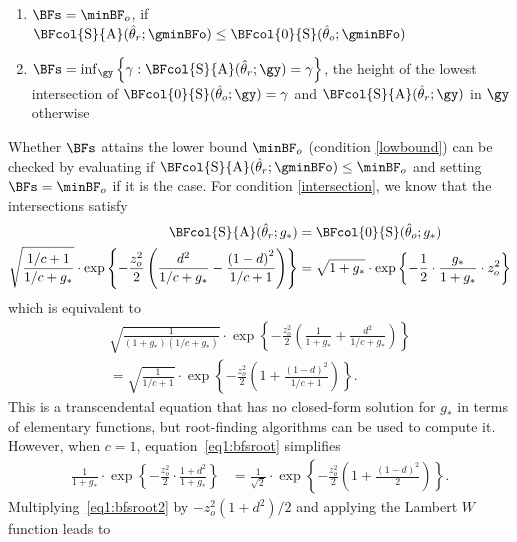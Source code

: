 \begin{subappendices}
\begin{enumerate}
  \item \label{lowbound} $\BFs = \minBF_{o}$, if
  $\BFcol{\text{S}}{\text{A}}(\hat{\theta}_r; \gminBFo) \leq
  \BFcol{0}{\text{S}}(\hat{\theta}_o; \gminBFo)$

  \item \label{intersection}
  $\BFs = \inf_{\gy}
  \left\{\gamma : \BFcol{\text{S}}{\text{A}}(\hat{\theta}_r; \gy)
  = \gamma\right\}$,
  the height of the lowest intersection of
  $\BFcol{0}{\text{S}}(\hat{\theta}_o; \gy) = \gamma$ and
  $\BFcol{\text{S}}{\text{A}}(\hat{\theta}_r; \gy)$
  in $\gy$ otherwise
\end{enumerate}
Whether $\BFs$ attains the lower bound $\minBF_{o}$ (condition \ref{lowbound})
can be checked by evaluating if
$\BFcol{\text{S}}{\text{A}}(\hat{\theta}_r; \gminBFo) \leq \minBF_{o}$ and setting
$\BFs = \minBF_{o}$ if it is the case. For condition \ref{intersection}, we know
that the intersections satisfy
\begin{align*}
  \BFcol{\text{S}}{\text{A}}(\hat{\theta}_r; g_*) &=
  \BFcol{0}{\text{S}}(\hat{\theta}_o; g_*) \\
  \sqrt{\frac{1/c + 1}{1/c + g_*}} \cdot
  \exp\left\{-\frac{z_{o}^{2}}{2}\left(\frac{d^2}{1/c + g_*} -
  \frac{\left(1 - d\right)^2}{1/c + 1} \right)\right\}
  &= \sqrt{1 + g_*} \cdot
  \exp\left\{-\frac{1}{2} \cdot \frac{g_*}{1 + g_*} \cdot z^2_o\right\}
\end{align*}
which is equivalent to
\begin{align}
  \sqrt{\frac{1}{(1 + g_*)(1/c + g_*)}}\cdot\exp\left\{-\frac{z_{o}^{2}}{2}\left(
  \frac{1}{1 + g_*} + \frac{d^{2}}{1/c + g_*}\right)\right\} \nonumber \\
  = \sqrt{\frac{1}{1/c + 1}}\cdot\exp\left\{-\frac{z_{o}^{2}}{2}\left(
  1 + \frac{(1 - d)^{2}}{1/c + 1}\right)\right\}.
  \label{eq1:bfsroot}
\end{align}
This is a transcendental equation that has no closed-form solution for $g_*$ in
terms of elementary functions, but root-finding algorithms can be used to
compute it. However, when $c = 1$, equation~\eqref{eq1:bfsroot} simplifies
\begin{align}
  \label{eq1:bfsroot2}
  \frac{1}{1 + g_*}\cdot\exp\left\{-\frac{z_{o}^{2}}{2} \cdot
  \frac{1 + d^{2}}{1 + g_*}\right\}
  &= \frac{1}{\sqrt{2}}\cdot\exp\left\{-\frac{z_{o}^{2}}{2}\left(
  1 + \frac{(1 - d)^{2}}{2}\right)\right\}.
\end{align}
Multiplying~\eqref{eq1:bfsroot2} by $-z_{o}^{2}(1 + d^{2})/2$ and applying the
Lambert $W$ function leads to

\end{subappendices}
